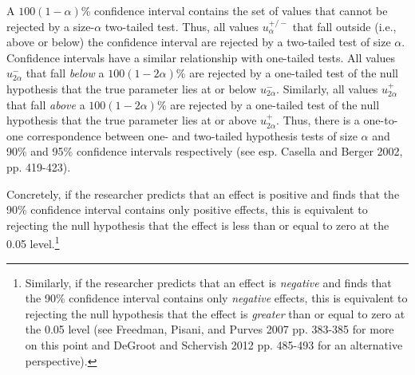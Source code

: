 \documentclass[12pt]{article}
\begin{document}
A $100(1-\alpha)$\% confidence interval contains the set of values that cannot be rejected by a size-$\alpha$ two-tailed test. Thus, all values $u^{+/-}_{\alpha}$ that fall outside (i.e., above or below) the confidence interval are rejected by a two-tailed test of size $\alpha$. Confidence intervals have a similar relationship with one-tailed tests. All values $u^{-}_{2\alpha}$ that fall \textit{below} a $100(1-2\alpha)$\% are rejected by a one-tailed test of the null hypothesis that the true parameter lies at or below $u^{-}_{2\alpha}$. Similarly, all values $u^{+}_{2\alpha}$ that fall \textit{above} a $100(1-2\alpha)$\% are rejected by a one-tailed test of the null hypothesis that the true parameter lies at or above $u^{+}_{2\alpha}$. Thus, there is a one-to-one correspondence between one- and two-tailed hypothesis tests of size $\alpha$ and 90\% and 95\% confidence intervals respectively (see esp. Casella and Berger 2002, pp. 419-423).

Concretely, if the researcher predicts that an effect is positive and finds that the 90\% confidence interval contains only positive effects, this is equivalent to rejecting the null hypothesis that the effect is less than or equal to zero at the 0.05 level.\footnote{Similarly, if the researcher predicts that an effect is \textit{negative} and finds that the 90\% confidence interval contains only \textit{negative} effects, this is equivalent to rejecting the null hypothesis that the effect is \textit{greater} than or equal to zero at the 0.05 level (see Freedman, Pisani, and Purves 2007 pp. 383-385 for more on this point and DeGroot and Schervish 2012 pp. 485-493 for an alternative perspective).}

\end{document}
